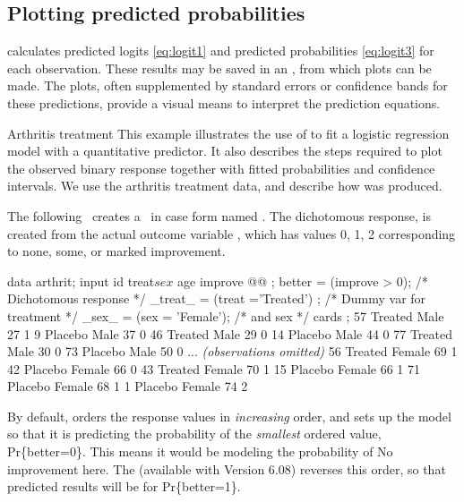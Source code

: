 \subsection{Plotting predicted probabilities}\label{sec:logist-quantp}
 calculates
predicted logits \eqref{eq:logit1}
and 
predicted probabilities \eqref{eq:logit3}
for each observation.
These results may be saved in an \ODS, from which plots
can be made.  The plots, often supplemented by standard errors or
confidence bands for these predictions, provide a visual means to
interpret the prediction equations.


\begin{Example}[arthrit7]{Arthritis treatment}
This example illustrates the use of  to fit a logistic
regression model with a quantitative predictor.
It also describes the steps required
to plot the observed binary response together with fitted
probabilities and confidence intervals.
We use the arthritis treatment data, and describe how
 was produced.

The following \Dstp\ creates a \Dset\ in case form
named .  The dichotomous response,
 is created from the actual outcome
variable , which has values 0, 1, 2
corresponding to none, some, or marked improvement.

\begin{listing}
data arthrit;
   input id treat$ sex$ age improve @@ ;
   better  = (improve > 0);            /* Dichotomous response    */
   _treat_ = (treat ='Treated') ;      /* Dummy var for treatment */
   _sex_   = (sex = 'Female');         /*           and sex       */
  cards ;
57 Treated Male   27 1   9 Placebo Male   37 0
46 Treated Male   29 0  14 Placebo Male   44 0
77 Treated Male   30 0  73 Placebo Male   50 0
  ... {\it (observations omitted)}
56 Treated Female 69 1  42 Placebo Female 66 0
43 Treated Female 70 1  15 Placebo Female 66 1
                        71 Placebo Female 68 1
                         1 Placebo Female 74 2
\end{listing}

By default,  orders the response
values in \emph{increasing} order, and sets up the model so that it is
predicting the probability of the \emph{smallest} ordered value,
Pr\{better=0\}.  This means it would be modeling the probability of No
improvement here.  
The  (available with Version 6.08)
reverses this order, so that predicted results will be for
Pr\{better=1\}.


\end{Example}
